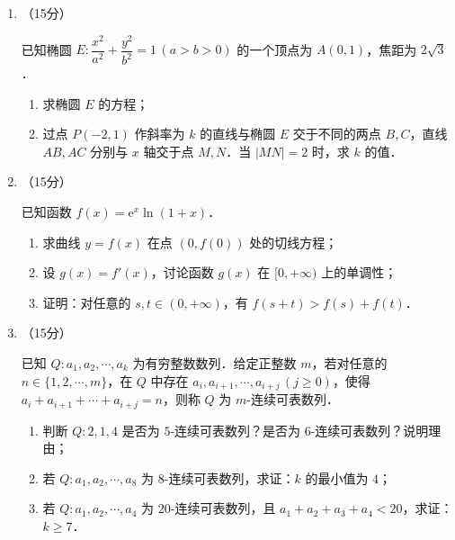 \begin{description}
\begin{enumerate}[leftmargin=5pt]
        假设用频率估计概率，且甲、乙、丙的比赛成绩相互独立．

        \begin{enumerate}[label=(\arabic*)]
            \item 估计甲在校运动会铅球比赛中获得优秀奖的概率；
            \item 设 $X$ 是甲、乙、丙在校运动会铅球比赛中获得优秀奖的总人数，估计 $X$ 的数学期望 $EX$；
            \item 在校运动会铅球比赛中，甲、乙、丙谁获得冠军的概率估计值最大？（结论不要求证明）
        \end{enumerate}

        \item （15分）

        已知椭圆 $E:\dfrac{x^2}{a^2}+\dfrac{y^2}{b^2}=1\,(a>b>0)$ 的一个顶点为 $A(0,1)$，焦距为 $2\sqrt{3}$．

        \begin{enumerate}[label=(\arabic*)]
            \item 求椭圆 $E$ 的方程；
            \item 过点 $P(-2,1)$ 作斜率为 $k$ 的直线与椭圆 $E$ 交于不同的两点 $B,C$，直线 $AB,AC$ 分别与 $x$ 轴交于点 $M,N$．当 $|MN|=2$ 时，求 $k$ 的值．
        \end{enumerate}

        \item （15分）

        已知函数 $f(x)=\mathrm{e}^x\ln(1+x)$．

        \begin{enumerate}[label=(\arabic*)]
            \item 求曲线 $y=f(x)$ 在点 $(0,f(0))$ 处的切线方程；
            \item 设 $g(x)=f'(x)$，讨论函数 $g(x)$ 在 $[0,+\infty)$ 上的单调性；
            \item 证明：对任意的 $s,t\in(0,+\infty)$，有 $f(s+t)>f(s)+f(t)$．
        \end{enumerate}

        \item （15分）

        已知 $Q:a_1,a_2,\cdots,a_k$ 为有穷整数数列．给定正整数 $m$，若对任意的 $n\in\{1,2,\cdots,m\}$，在 $Q$ 中存在 $a_i,a_{i+1},\cdots,a_{i+j}\,(j\geqslant0)$，使得 $a_i+a_{i+1}+\cdots+a_{i+j}=n$，则称 $Q$ 为 $m$-连续可表数列．

        \begin{enumerate}[label=(\arabic*)]
            \item 判断 $Q:2,1,4$ 是否为 $5$-连续可表数列？是否为 $6$-连续可表数列？说明理由；
            \item 若 $Q:a_1,a_2,\cdots,a_8$ 为 $8$-连续可表数列，求证：$k$ 的最小值为 $4$；
            \item 若 $Q:a_1,a_2,\cdots,a_4$ 为 $20$-连续可表数列，且 $a_1+a_2+a_3+a_4<20$，求证：$k\geqslant7$．
        \end{enumerate}
    \end{enumerate}
\end{description}
\clearpage


